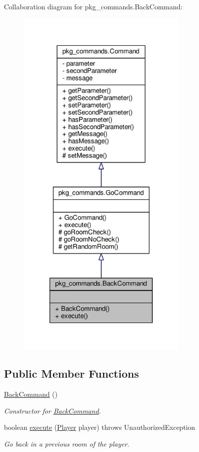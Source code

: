 Collaboration diagram for pkg\-\_\-commands.\-Back\-Command\-:\nopagebreak
\begin{figure}[H]
\begin{center}
\leavevmode
\includegraphics[width=236pt]{classpkg__commands_1_1BackCommand__coll__graph}
\end{center}
\end{figure}
\subsection*{Public Member Functions}
\begin{DoxyCompactItemize}
\item 
\hyperlink{classpkg__commands_1_1BackCommand_a81518eb89a9e9126e51f2f7ba6ff1ed9}{Back\-Command} ()
\begin{DoxyCompactList}\small\item\em Constructor for \hyperlink{classpkg__commands_1_1BackCommand}{Back\-Command}. \end{DoxyCompactList}\item 
boolean \hyperlink{classpkg__commands_1_1BackCommand_a35bf0276436a619d7baeb9c3a752f9d6}{execute} (\hyperlink{classpkg__world_1_1Player}{Player} player)  throws Unauthorized\-Exception 
\begin{DoxyCompactList}\small\item\em Go back in a previous room of the player. \end{DoxyCompactList}\end{DoxyCompactItemize}
